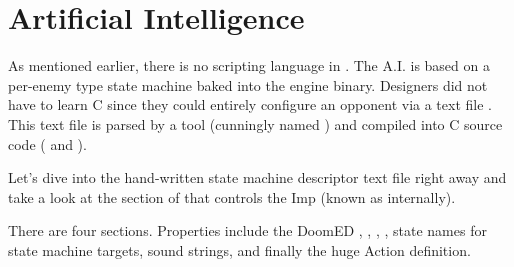 \section{Artificial Intelligence}
As mentioned earlier, there is no scripting language in \doom. The A.I. is based on a per-enemy type state machine baked into the engine binary. Designers did not have to learn C since they could entirely configure an opponent via a text file . This text file is parsed by a tool (cunningly named ) and compiled into C source code ( and ).\\
\par
{}
\par
Let's dive into the hand-written state machine descriptor text file right away and take a look at the section of  that controls the Imp (known as  internally).\\
\par
{}


There are four sections. Properties include the DoomED , , , , state names for state machine targets, sound strings, and finally the huge Action definition.






